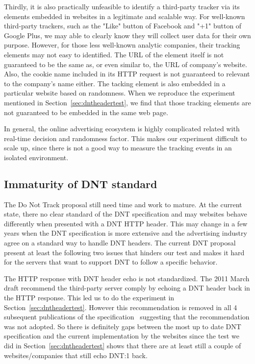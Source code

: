 \documentclass{sig-alternate}
\begin{document}
Thirdly, it is also practically unfeasible to identify a third-party tracker via its elements embedded in websites in a legitimate and scalable way. For well-known third-party trackers, such as the "Like" button of Facebook and "+1" button of Google Plus, we may able to clearly know they will collect user data for their own purpose. However, for those less well-known analytic companies, their tracking elements may not easy to identified. The URL of the element itself is not guaranteed to be the same as, or even similar to, the URL of company's website. Also, the cookie name included in its HTTP request is not guaranteed to relevant to the company's name either. The tacking element is also embedded in a particular website based on randomness. When we reproduce the experiment mentioned in Section~\ref{sec:dntheadertest}, we find that those tracking elements are not guaranteed to be embedded in the same web page.

In general, the online advertising ecosystem is highly complicated related with real-time decision and randomness factor. This makes our experiment difficult to scale up, since there is not a good way to measure the tracking events in an isolated environment.

\subsection{Immaturity of DNT standard}

The Do Not Track proposal still need time and work to mature. At the current state, there no clear standard of the DNT specification and may websites behave differently when presented with a DNT HTTP header. This may change in a few years when the DNT specification is more extensive and the advertising industry agree on a standard way to handle DNT headers. The current DNT proposal present at least the following two issues that hinders our test and makes it hard for the servers that want to support DNT to follow a specific behavior.

The HTTP response with DNT header echo is not standardized. The 2011 March draft recommend the third-party server comply by echoing a DNT header back in the HTTP response. This led us to do the experiment in Section~\ref{sec:dntheadertest}. However this recommendation is removed in all 4 subsequent publications of the specification~\cite{tracking_dnt20130430, tracking_dnt20121002, tracking_dnt20120313, tracking_dnt20111114} suggesting that the recommendation was not adopted. So there is definitely gaps between the most up to date DNT specification and the current implementation by the websites since the test we did in Section~\ref{sec:dntheadertest} shows that there are at least still a couple of websites/companies that still echo DNT:1 back.
\end{document}
